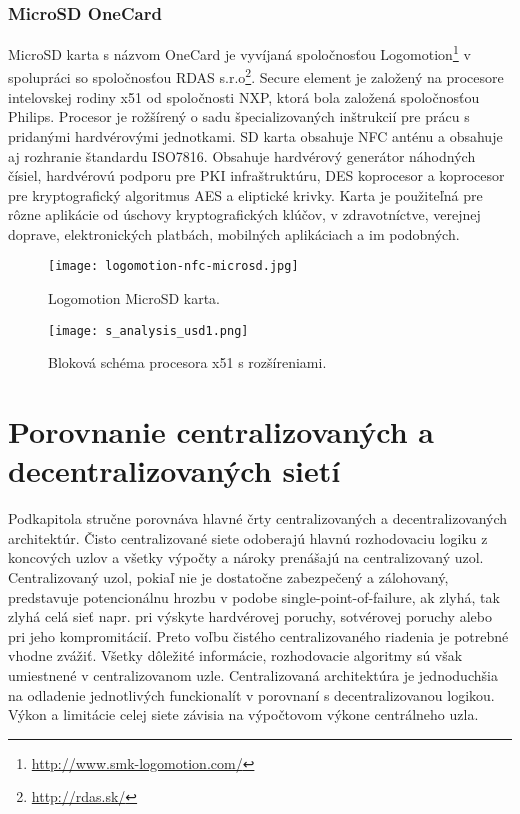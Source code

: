 \documentclass[12pt,a4wide,oneside,openright]{report}
\begin{document}
\subsubsection{MicroSD OneCard} \label{s_sd_usd}
MicroSD karta s názvom OneCard je vyvíjaná spoločnosťou Logomotion\footnote{\url{http://www.smk-logomotion.com/}} v spolupráci so spoločnosťou RDAS s.r.o\footnote{\url{http://rdas.sk/}}.
Secure element je založený na procesore intelovskej rodiny x51 od spoločnosti NXP, ktorá bola založená spoločnosťou Philips. Procesor je rožšírený o sadu špecializovaných inštrukcií pre prácu s pridanými hardvérovými jednotkami.
SD karta obsahuje NFC anténu a obsahuje aj rozhranie štandardu ISO7816. Obsahuje hardvérový generátor náhodných čísiel, hardvérovú podporu pre PKI infraštruktúru, DES koprocesor a koprocesor pre kryptografický algoritmus AES a eliptické krivky. Karta je použiteľná pre rôzne aplikácie od úschovy kryptografických klúčov, v zdravotníctve, verejnej doprave, elektronických platbách, mobilných aplikáciach a im podobných.

\begin{figure*}[h]
	\centering
	\texttt{[image: logomotion-nfc-microsd.jpg]}
	\caption{Logomotion MicroSD karta.\cite{lgmsd}}
	\label{f:usd}
\end{figure*}

\begin{figure*}[h]
	\centering
	\texttt{[image: s\_analysis\_usd1.png]}
	\caption{Bloková schéma procesora x51 s rozšíreniami. \cite{nxpp5c}}
	\label{f:o_usd1}
\end{figure*}


\section{Porovnanie centralizovaných a decentralizovaných sietí} \label{s_centrilized_decentrilized}
Podkapitola stručne porovnáva hlavné črty centralizovaných a decentralizovaných architektúr.
Čisto centralizované siete odoberajú hlavnú rozhodovaciu logiku z koncových uzlov a všetky výpočty a nároky prenášajú na centralizovaný uzol. Centralizovaný uzol, pokiaľ nie je dostatočne zabezpečený a zálohovaný, predstavuje potencionálnu hrozbu v podobe single-point-of-failure, ak zlyhá, tak zlyhá celá sieť napr. pri výskyte hardvérovej poruchy, sotvérovej poruchy alebo pri jeho kompromitácií. Preto voľbu čistého centralizovaného riadenia je potrebné vhodne zvážiť. Všetky dôležité informácie, rozhodovacie algoritmy sú však umiestnené v centralizovanom uzle.
Centralizovaná architektúra je jednoduchšia na odladenie jednotlivých funckionalít v porovnaní s decentralizovanou logikou. Výkon a limitácie celej siete závisia na výpočtovom výkone centrálneho uzla.
\end{document}
